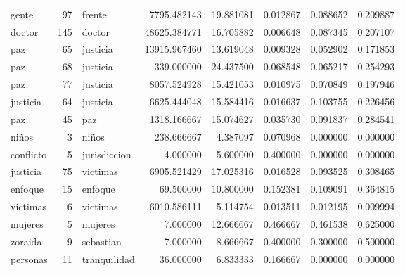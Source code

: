 \begin{tabular}{lrlrrrrr}
gente & 97 & frente & 7795.482143 & 19.881081 & 0.012867 & 0.088652 & 0.209887 \\
doctor & 145 & doctor & 48625.384771 & 16.705882 & 0.006648 & 0.087345 & 0.207107 \\
paz & 65 & justicia & 13915.967460 & 13.619048 & 0.009328 & 0.052902 & 0.171853 \\
paz & 68 & justicia & 339.000000 & 24.437500 & 0.068548 & 0.065217 & 0.254293 \\
paz & 77 & justicia & 8057.524928 & 15.421053 & 0.010975 & 0.070849 & 0.197946 \\
justicia & 64 & justicia & 6625.444048 & 15.584416 & 0.016637 & 0.103755 & 0.226456 \\
paz & 45 & paz & 1318.166667 & 15.074627 & 0.035730 & 0.091837 & 0.284541 \\
niños & 3 & niños & 238.666667 & 4.387097 & 0.070968 & 0.000000 & 0.000000 \\
conflicto & 5 & jurisdiccion & 4.000000 & 5.600000 & 0.400000 & 0.000000 & 0.000000 \\
justicia & 75 & victimas & 6905.521429 & 17.025316 & 0.016528 & 0.093525 & 0.308465 \\
enfoque & 15 & enfoque & 69.500000 & 10.800000 & 0.152381 & 0.109091 & 0.364815 \\
victimas & 6 & victimas & 6010.586111 & 5.114754 & 0.013511 & 0.012195 & 0.009994 \\
mujeres & 5 & mujeres & 7.000000 & 12.666667 & 0.466667 & 0.461538 & 0.625000 \\
zoraida & 9 & sebastian & 7.000000 & 8.666667 & 0.400000 & 0.300000 & 0.500000 \\
personas & 11 & tranquilidad & 36.000000 & 6.833333 & 0.166667 & 0.000000 & 0.000000 \\
\bottomrule
\end{tabular}
